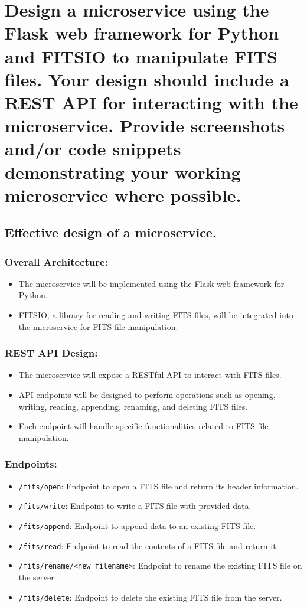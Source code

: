 \documentclass[a4paper,oneside,11pt]{book}
\begin{document}
\section{Design a microservice using the Flask web framework for Python and FITSIO to manipulate FITS files. Your design should include a REST API for interacting with the microservice. Provide screenshots and/or code snippets demonstrating your working microservice where possible.}
\subsection{Effective design of a microservice.}
\subsubsection{Overall Architecture:}
\begin{itemize}
    \item The microservice will be implemented using the Flask web framework for Python.
    \item FITSIO, a library for reading and writing FITS files, will be integrated into the microservice for FITS file manipulation.
\end{itemize}
\subsubsection{REST API Design:}
\begin{itemize}
    \item The microservice will expose a RESTful API to interact with FITS files.
    \item API endpoints will be designed to perform operations such as opening, writing, reading, appending, renaming, and deleting FITS files.
    \item Each endpoint will handle specific functionalities related to FITS file manipulation.
\end{itemize}
\subsubsection{Endpoints:}
\begin{itemize}
    \item \texttt{/fits/open}: Endpoint to open a FITS file and return its header information.
    \item \texttt{/fits/write}: Endpoint to write a FITS file with provided data.
    \item \texttt{/fits/append}: Endpoint to append data to an existing FITS file.
    \item \texttt{/fits/read}: Endpoint to read the contents of a FITS file and return it.
    \item \texttt{/fits/rename/<new\_filename>}: Endpoint to rename the existing FITS file on the server.
    \item \texttt{/fits/delete}: Endpoint to delete the existing FITS file from the server.
\end{itemize}
\end{document}
